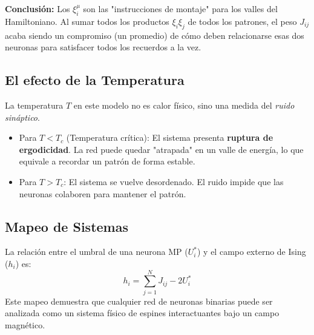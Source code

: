 \textbf{Conclusión:} Los $\xi_i^\mu$ son las "instrucciones de montaje" para los valles del Hamiltoniano. Al sumar todos los productos $\xi_i \xi_j$ de todos los patrones, el peso $J_{ij}$ acaba siendo un compromiso (un promedio) de cómo deben relacionarse esas dos neuronas para satisfacer todos los recuerdos a la vez.

\subsection{El efecto de la Temperatura}
La temperatura $T$ en este modelo no es calor físico, sino una medida del \textit{ruido sináptico}. 
\begin{itemize}
    \item Para $T < T_c$ (Temperatura crítica): El sistema presenta \textbf{ruptura de ergodicidad}. La red puede quedar "atrapada" en un valle de energía, lo que equivale a recordar un patrón de forma estable.
    \item Para $T > T_c$: El sistema se vuelve desordenado. El ruido impide que las neuronas colaboren para mantener el patrón.
\end{itemize}

\subsection{Mapeo de Sistemas}
La relación entre el umbral de una neurona MP ($U_i^*$) y el campo externo de Ising ($h_i$) es:
\begin{equation}
    h_i = \sum_{j=1}^N J_{ij} - 2U_i^*
\end{equation}
Este mapeo demuestra que cualquier red de neuronas binarias puede ser analizada como un sistema físico de espines interactuantes bajo un campo magnético.